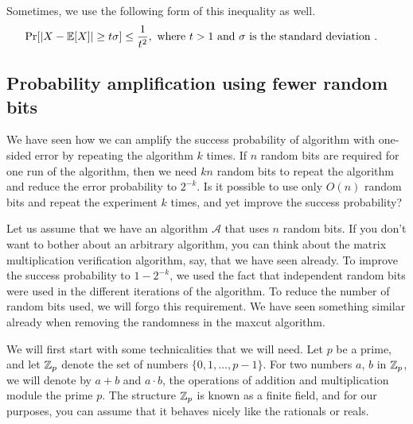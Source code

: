 Sometimes, we use the following form of this inequality as well.
\begin{align*}
	\Pr[|X-\mathbb{E}[X]| \geq t\sigma] &\leq \frac{1}{t^2}, \text{ where $t >1$ and $\sigma$ is the standard deviation }.
\end{align*}

\subsection{Probability amplification using fewer random bits}

We have seen how we can amplify the success probability of algorithm with one-sided error by repeating the algorithm $k$ times. If $n$ random bits are required for one run of the algorithm, then we need $kn$ random bits to repeat the algorithm and reduce the error probability to $2^{-k}$. Is it possible to use only $O(n)$ random bits and repeat the experiment $k$ times, and yet improve the success probability?

Let us assume that we have an algorithm $\mathcal{A}$ that uses $n$ random bits. If you don't want to bother about an arbitrary algorithm, you can think about the matrix multiplication verification algorithm, say, that we have seen already. To improve the success probability to $1-2^{-k}$, we used the fact that independent random bits were used in the different iterations of the algorithm. To reduce the number of random bits used, we will forgo this requirement. We have seen something similar already when removing the randomness in the maxcut algorithm.

We will first start with some technicalities that we will need. Let $p$ be a prime, and let $\mathbb{Z}_p$ denote the set of numbers $\{0,1,\ldots, p-1\}$. For two numbers $a$, $b$ in $\mathbb{Z}_p$, we will denote by $a+b$ and $a\cdot b$, the operations of addition and multiplication module the prime $p$. The structure $\mathbb{Z}_p$ is known as a finite field, and for our purposes, you can assume that it behaves nicely like the rationals or reals. 


